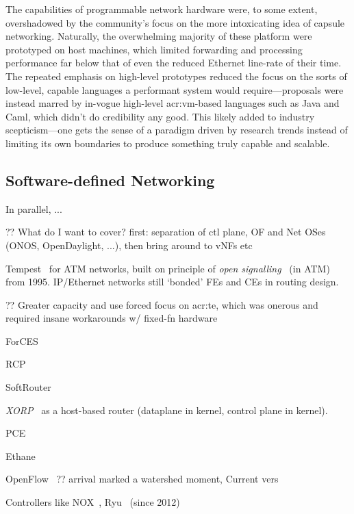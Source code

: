 The capabilities of programmable network hardware were, to some extent, overshadowed by the community's focus on the more intoxicating idea of capsule networking.
Naturally, the overwhelming majority of these platform were prototyped on host machines, which limited forwarding and processing performance far below that of even the reduced Ethernet line-rate of their time.
The repeated emphasis on high-level prototypes reduced the focus on the sorts of low-level, capable languages a performant system would require---proposals were instead marred by in-vogue high-level \gls{acr:vm}-based languages such as Java and Caml, which didn't do credibility any good.
This likely added to industry scepticism---one gets the sense of a paradigm driven by research trends instead of limiting its own boundaries to produce something truly capable and scalable.

\subsection{Software-defined Networking}
In parallel, ...

?? What do I want to cover? first: separation of ctl plane, OF and Net OSes (ONOS, OpenDaylight, ...), then bring around to vNFs etc

Tempest~\parencite{DBLP:journals/network/MerweRLC98} for ATM networks, built on principle of \emph{open signalling}~\parencite{DBLP:journals/ccr/CampbellKMV99} (in ATM) from 1995. IP/Ethernet networks still `bonded' FEs and CEs in routing design.

?? Greater capacity and use forced focus on \gls{acr:te}, which was onerous and required insane workarounds w/ fixed-fn hardware~\parencite{DBLP:journals/ccr/FeamsterRZ14}

ForCES~\parencite{rfc3746}

RCP~\parencite{DBLP:conf/nsdi/CaesarCFRSM05,10.1145/1016707.1016709}

SoftRouter~~\parencite{lakshman2004the}

\emph{XORP}~\parencite{DBLP:journals/ccr/HandleyHK03} as a host-based router (dataplane in kernel, control plane in kernel).

PCE~\parencite{rfc4655}

Ethane~\parencite{DBLP:conf/sigcomm/CasadoFPLMS07}

OpenFlow~\parencite{DBLP:journals/ccr/McKeownABPPRST08} ?? arrival marked a watershed moment, Current vers~\parencite{openflow-1-5}

Controllers like NOX~\parencite{DBLP:journals/ccr/GudeKPPCMS08}, Ryu~\parencite{ryu} (since 2012)

